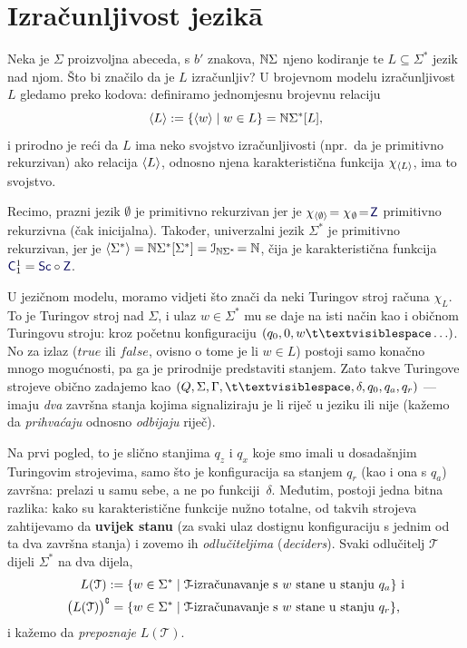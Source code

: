 \section{Izračunljivost jezik\=a}\label{sec:Todl}

Neka je $\Sigma$ proizvoljna abeceda, s $b'$ znakova, ${\mathbb N}\Sigma$ njeno kodiranje te $L\subseteq\Sigma^*$ jezik nad njom. Što bi značilo da je $L$ izračunljiv?
U brojevnom modelu izračunljivost $L$ gledamo preko kodova: definiramo jednomjesnu brojevnu relaciju
\begin{equation}\label{eq:kodLdef}
    \langle L\rangle:=\{\langle w\rangle\mid w\in L\}={\mathbb N}\Sigma^*[L]\text,
\end{equation}
i prirodno je reći da $L$ ima neko svojstvo izračunljivosti (npr.\ da je primitivno rekurzivan) ako relacija $\langle L\rangle$, odnosno njena karakteristična funkcija $\chi_{\langle L\rangle}$, ima to svojstvo.

Recimo, prazni jezik $\emptyset$ je primitivno rekurzivan jer je $\chi_{\kr\emptyset}\!=\chi_{\mspace{1mu}\emptyset}\!=\!\f Z$ primitivno rekurzivna (čak inicijalna). Također, univerzalni jezik $\Sigma^*$ je primitivno rekurzivan, jer je $\langle\Sigma^*\rangle={\mathbb N}\Sigma^*[\Sigma^*]=\mathcal I_{{\mathbb N}\Sigma^*}\!={\mathbb N}$, čija je karakteristična funkcija $\f C_1^1=\f{Sc}\circ\f Z$.

U jezičnom modelu, moramo vidjeti što znači da neki Turingov stroj računa $\chi_L$. To je Turingov stroj nad $\Sigma$, i ulaz $w\in\Sigma^*$ mu se daje na isti način kao i običnom Turingovu stroju: kroz početnu konfiguraciju $(q_0,0,w\bl\ldots)$. No za izlaz ($\mathit{true}$ ili $\mathit{false}$, ovisno o tome je li $w\in L$) postoji samo konačno mnogo mogućnosti, pa ga je prirodnije predstaviti stanjem. Zato takve Turingove strojeve obično zadajemo kao $(Q,\Sigma,\Gamma,\bl,\delta,q_0,q_a,q_r)$ --- imaju \emph{dva} završna stanja kojima signaliziraju je li riječ u jeziku ili nije (kažemo da \emph{prihvaćaju} odnosno \emph{odbijaju} riječ).

Na prvi pogled, to je slično stanjima $q_z$ i $q_x$ koje smo imali u dosadašnjim Turingovim strojevima, samo što je konfiguracija sa stanjem $q_r$ (kao i ona s $q_a$) završna: prelazi u samu sebe, a ne po funkciji~$\delta$. Međutim, postoji jedna bitna razlika: kako su karakteristične funkcije nužno totalne, od takvih strojeva zahtijevamo da \textbf{uvijek stanu} (za svaki ulaz dostignu konfiguraciju s jednim od ta dva završna stanja) i zovemo ih \emph{odlučiteljima} (\emph{deciders}). Svaki odlučitelj $\mathcal T$ dijeli $\Sigma^*$ na dva dijela,
\begin{align}
    L(\mathcal T):=\{w\in\Sigma^*&\mid\text{$\mathcal T$\!-izračunavanje s $w$ stane u stanju $q_a$}\}
    \text{ i}\\ \bigl(L(\mathcal T)\big)\sp{{\scriptscriptstyle\complement}}=\{w\in\Sigma^*&\mid\text{$\mathcal T$\!-izračunavanje s $w$ stane u stanju $q_r$}\}\text,
\end{align} i kažemo da \emph{prepoznaje} $L(\mathcal T)$.

